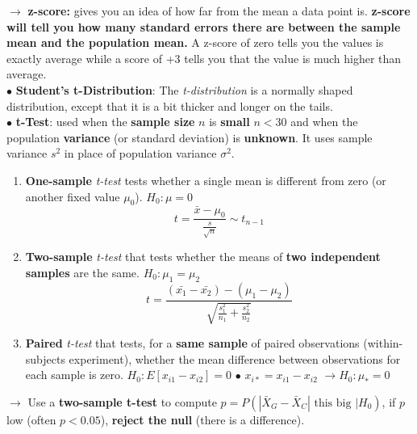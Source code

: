\documentclass[letterpaper, 10.5pt,landscape]{article}
\begin{document}
\begin{multicols*}{3}
\hspace{5pt} $\rightarrow$ \textbf{z-score:} gives you an idea of how far from the mean a data point is. \textbf{z-score will tell you how many standard errors there are between the sample mean and the population mean.}  A z-score of zero tells you the values is exactly average while a score of +3 tells you that the value is much higher than average. \\



\vspace{3pt}
$\bullet$ \textbf{Student's t-Distribution}: The \textit{t-distribution} is a normally shaped distribution, except that it is a bit thicker and longer on the tails. \\

$\bullet$ \textbf{t-Test}: used when the \textbf{sample size} $n$ is \textbf{small} $n<30$ and when the population \textbf{variance} (or standard deviation) is \textbf{unknown}. It uses sample variance $s^{2}$ in place of population variance $\sigma^{2}$.


\begin{enumerate}
    \item \textbf{One-sample} \textit{t-test} tests whether a single mean is different from zero (or another fixed value $\mu_{0}$). \(\boxed{H_{0}: \mu = 0} \)
    \vspace{-3pt}
    \[\boxed{t = \frac{\bar{x} - \mu_{0}}{\frac{s}{\sqrt{n}}}  \sim t_{n-1}}\]
    \item \textbf{Two-sample} \textit{t-test} that tests whether the means of \textbf{two independent samples} are the same. \(\boxed{H_{0}: \mu_{1} = \mu_{2}} \)
     \vspace{-3pt}
    \[\boxed{t = \frac{\left(\bar{x_{1}} - \bar{x_{2}} \right) - \left( \mu_{1} - \mu_{2} \right)}{\sqrt{\frac{s^{2}_{1}}{n_{1}} + \frac{s^{2}_{2}}{n_{2}}}}} \]

    \item \textbf{Paired} \textit{t-test}  that tests, for a \textbf{same sample} of paired observations (within-subjects experiment), whether the mean difference between observations for each sample is zero. 
    \(\boxed{H_{0}: E[{x_{i1} - x_{i2}}] = 0} \) \; $\bullet$ $x_{i*} = x_{i1} - x_{i2}$ $\rightarrow \boxed{H_{0}: \mu_{*} = 0}$
\end{enumerate}


$\rightarrow$ Use a \textbf{two-sample t-test} to compute \(\boxed{p = P(|\bar{X}_{G} - \bar{X}_{C}| \text{ this big }| H_{0})} \), if $p$ low (often $p < 0.05$), \textbf{reject the null} (there is a difference).



\end{multicols*}
\end{document}
